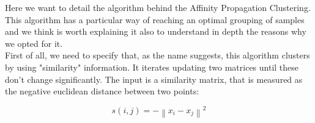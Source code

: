 Here we want to detail the algorithm behind the Affinity Propagation Clustering. This algorithm has a particular way of reaching an optimal grouping of samples and we think is worth explaining it also to understand in depth the reasons why we opted for it.\\
First of all, we need to specify that, as the name suggests, this algorithm clusters by using "similarity" information. It iterates updating two matrices until these don't change significantly. The input is a similarity matrix, that is measured as the negative euclidean distance between two points:

\begin{equation} \label{similarity_matrix}
s(i,j) = - \left \lVert x_i - x_j \right \rVert ^ 2
\end{equation}

